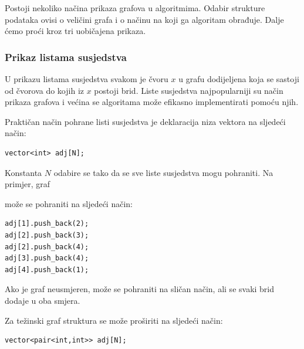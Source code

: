 Postoji nekoliko načina prikaza grafova
u algoritmima.
Odabir strukture podataka
ovisi o veličini grafa i
o načinu na koji ga algoritam obrađuje.
Dalje ćemo proći kroz tri uobičajena prikaza.

\subsubsection{Prikaz listama susjedstva}


U prikazu listama susjedstva
svakom je čvoru $x$ u grafu dodijeljena 
koja se sastoji od čvorova
do kojih iz $x$ postoji brid.
Liste susjedstva najpopularniji su
način prikaza grafova i većina se algoritama može
efikasno implementirati pomoću njih.

Praktičan način pohrane listi susjedstva je deklaracija
niza vektora na sljedeći način:
\begin{lstlisting}
vector<int> adj[N];
\end{lstlisting}

Konstanta $N$ odabire se tako da se sve
liste susjedstva mogu pohraniti.
Na primjer, graf

\begin{center}
\end{center}
može se pohraniti na sljedeći način:
\begin{lstlisting}
adj[1].push_back(2);
adj[2].push_back(3);
adj[2].push_back(4);
adj[3].push_back(4);
adj[4].push_back(1);
\end{lstlisting}

Ako je graf neusmjeren, može se pohraniti na sličan način,
ali se svaki brid dodaje u oba smjera.

Za težinski graf struktura se može proširiti
na sljedeći način:

\begin{lstlisting}
vector<pair<int,int>> adj[N];
\end{lstlisting}

